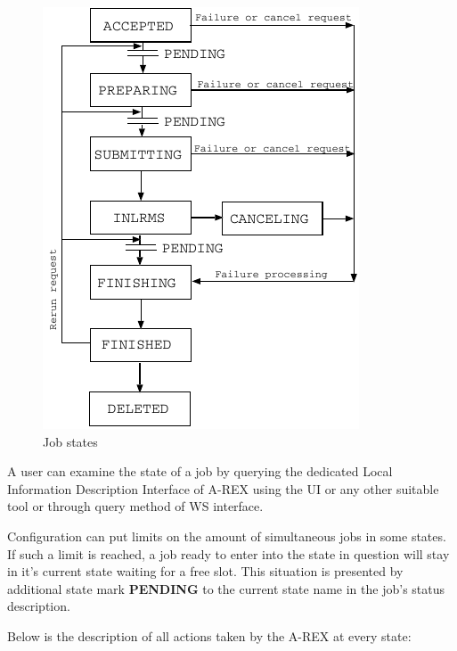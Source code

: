 \documentclass{article}                            %
\begin{document}
\begin{figure}[th]
\centering \includegraphics{pic1.pdf}
\caption{\label{job states diagram}Job states}
\end{figure}

A user can examine the state of a job by querying the dedicated Local
Information Description Interface of A-REX using the UI or any other
suitable tool or through query method of WS interface. 

Configuration can put limits on the amount of simultaneous jobs in
some states. If such a limit is reached, a job ready to enter into
the state in question will stay in it's current state waiting for
a free slot. This situation is presented by additional state mark
\textbf{PENDING} to the current state name in the job's status description.

Below is the description of all actions taken by the A-REX at every
state:
\end{document}

